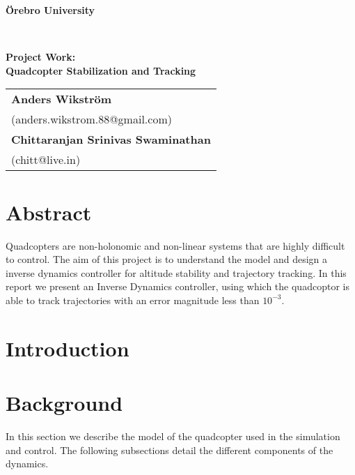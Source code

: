 \documentclass[12pt,fleqn]{article}
\begin{document}
\thispagestyle{empty}
\noindent\makebox[\linewidth]{\rule{.75\paperwidth}{0.4pt}}
\begin{center}
{\Large \textbf{{\"O}rebro University}}
\end{center}
\vspace{-4mm}
\noindent\makebox[\linewidth]{\rule{.75\paperwidth}{0.4pt}} \\
\vspace{4cm}
\begin{center}
{\Large\sffamily\bfseries
Project Work: \\[1ex]
Quadcopter Stabilization and Tracking \\[2ex]
}

\vspace{6cm}
\noindent\makebox[\linewidth]{\rule{.75\paperwidth}{0.4pt}}
{\large
\renewcommand{\arraystretch}{1.5}
  \begin{tabular}{l}
   \textbf{Anders Wikstr\"{o}m}\\
   (anders.wikstrom.88@gmail.com)\\
   \textbf{Chittaranjan Srinivas Swaminathan}\\
   (chitt@live.in)\\
 \end{tabular}}
\end{center}
\vspace{-2mm}
\noindent\makebox[\linewidth]{\rule{.75\paperwidth}{0.4pt}}
\newpage

\tableofcontents

\newpage



\section*{Abstract}
Quadcopters are non-holonomic and non-linear systems that are highly
difficult to control. The aim of this project is to understand the
model and design a inverse dynamics controller for altitude stability
and trajectory tracking. In this report we present an Inverse Dynamics
controller, using which the quadcoptor is able to track trajectories
with an error magnitude less than $10^{-3}$. 

\section{Introduction}

\section{Background}
In this section we describe the model of the quadcopter used in the
simulation and control. The following subsections detail the different
components of the dynamics.
\end{document}
